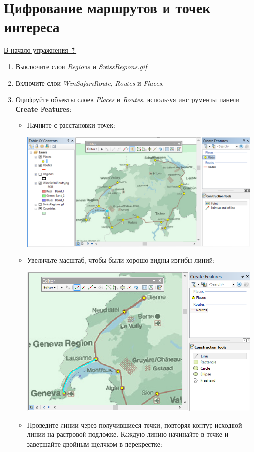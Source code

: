 \documentclass[]{book}
\theoremstyle{definition}
\theoremstyle{definition}
\theoremstyle{definition}
\theoremstyle{remark}
\begin{document}
\hypertarget{map-ref-general-routes-poi}{%
\section{Цифрование маршрутов и точек
интереса}\label{map-ref-general-routes-poi}}

\protect\hyperlink{map-ref-general}{В начало упражнения ⇡}

\begin{enumerate}
\def\labelenumi{\arabic{enumi}.}
\item
  Выключите слои \emph{Regions} и \emph{SwissRegions.gif}.
\item
  Включите слои \emph{WinSafariRoute}, \emph{Routes} и \emph{Places}.
\item
  Оцифруйте объекты слоев \emph{Places} и \emph{Routes}, используя
  инструменты панели \textbf{Сreate Features}:

  \begin{itemize}
  \item
    Начните с расстановки точек:

    \includegraphics{images/Ex05/image25.png}
  \item
    Увеличьте масштаб, чтобы были хорошо видны изгибы линий:

    \includegraphics{images/Ex05/image26.png}
  \item
    Проведите линии через получившиеся точки, повторяя контур исходной
    линии на растровой подложке. Каждую линию начинайте в точке и
    завершайте двойным щелчком в перекрестке:


\end{itemize}
\end{enumerate}
\end{document}
